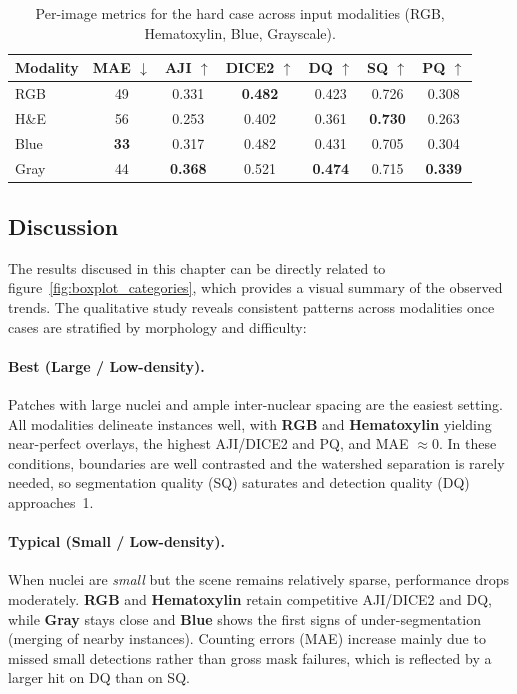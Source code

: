 \documentclass[target=bach,aauheader=,style=]{thud}
\begin{document}
\begin{table}[ht]
\centering
\caption{Per-image metrics for the hard case across input modalities (RGB, Hematoxylin, Blue, Grayscale). }
\label{tab:worst_metrics}
\begin{tabular}{lcccccc}
\toprule
Modality & MAE $\downarrow$ & AJI $\uparrow$ & DICE2 $\uparrow$ & DQ $\uparrow$ & SQ $\uparrow$ & PQ $\uparrow$ \\
\midrule
RGB  & 49 & 0.331 & \textbf{0.482} & 0.423 & 0.726 & 0.308 \\
H\&E & 56 & 0.253 & 0.402 & 0.361 & \textbf{0.730} & 0.263 \\
Blue & \textbf{33} & 0.317 & 0.482 & 0.431 & 0.705 & 0.304 \\
Gray & 44 & \textbf{0.368} & 0.521 & \textbf{0.474} & 0.715 & \textbf{0.339} \\
\bottomrule
\end{tabular}
\end{table}
\subsection{Discussion}
The results discused in this chapter can be directly related to figure~\ref{fig:boxplot_categories}, which provides a visual summary of the observed trends. The qualitative study reveals consistent patterns across modalities once cases are stratified by morphology and difficulty:

\paragraph{Best (Large / Low-density).}
Patches with large nuclei and ample inter-nuclear spacing are the easiest setting. All modalities delineate instances well, with \textbf{RGB} and \textbf{Hematoxylin} yielding near-perfect overlays, the highest AJI/DICE2 and PQ, and MAE $\approx 0$. In these conditions, boundaries are well contrasted and the watershed separation is rarely needed, so segmentation quality (SQ) saturates and detection quality (DQ) approaches~1.

\paragraph{Typical (Small / Low-density).}
When nuclei are \emph{small} but the scene remains relatively sparse, performance drops moderately. \textbf{RGB} and \textbf{Hematoxylin} retain competitive AJI/DICE2 and DQ, while \textbf{Gray} stays close and \textbf{Blue} shows the first signs of under-segmentation (merging of nearby instances). Counting errors (MAE) increase mainly due to missed small detections rather than gross mask failures, which is reflected by a larger hit on DQ than on SQ.
\end{document}

